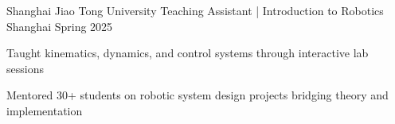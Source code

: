 
\vspace{-7mm}

\begin{cventries}
    \cventry
    {Shanghai Jiao Tong University} %
    {Teaching Assistant | Introduction to Robotics} %
    {Shanghai} %
    {Spring 2025} %
    {
        \vspace{-5mm}
        \begin{cvitems}
            \item{Taught kinematics, dynamics, and control systems through interactive lab sessions}
            \item{Mentored 30+ students on robotic system design projects bridging theory and implementation}
        \end{cvitems}
        \vspace{5mm}
    }
\end{cventries}
